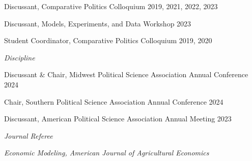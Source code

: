 \documentclass[10pt]{article}
\newcommand{\halfblankline}{\quad\vspace{-0.5\baselineskip}\pagebreak[3]}
\begin{document}
Discussant, Comparative Politics Colloquium \hfill  2019, 2021, 2022, 2023

Discussant, Models, Experiments, and Data Workshop \hfill 2023

Student Coordinator, Comparative Politics Colloquium \hfill 2019, 2020


\halfblankline






\textit{Discipline}


Discussant \& Chair, Midwest Political Science Association Annual Conference \hfill 2024

Chair, Southern Political Science Association Annual Conference \hfill 2024


Discussant, American Political Science Association Annual Meeting \hfill 2023

\halfblankline


\textit{Journal Referee}

\textit{Economic Modeling, American Journal of Agricultural Economics} 

\halfblankline










\end{document}
